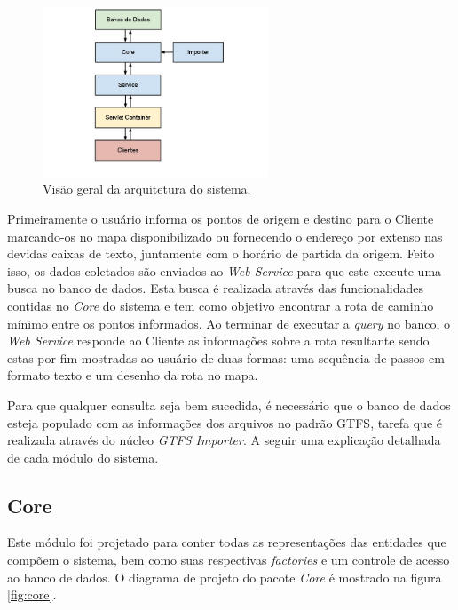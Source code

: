 \begin{figure}[!htb]
	\centering
	\includegraphics[width=0.6\textwidth]{./imgs/arquitetura.png}
	\caption[Arquitetura do sistema]{Visão geral da arquitetura do sistema.}
	\label{fig:arquitetura}
\end{figure}

Primeiramente o usuário informa os pontos de origem e destino para o Cliente marcando-os no mapa disponibilizado ou fornecendo o endereço por extenso nas devidas caixas de texto, juntamente com o horário de partida da origem.
Feito isso, os dados coletados são enviados ao \emph{Web Service} para que este execute uma busca no banco de dados. 
Esta busca é realizada através das funcionalidades contidas no \emph{Core} do sistema e tem como objetivo encontrar a rota de caminho mínimo entre os pontos informados.
Ao terminar de executar a \emph{query} no banco, o \emph{Web Service} responde ao Cliente as informações sobre a rota resultante sendo estas por fim mostradas ao usuário de duas formas: uma sequência de passos em formato texto e um desenho da rota no mapa.

Para que qualquer consulta seja bem sucedida, é necessário que o banco de dados esteja populado com as informações dos arquivos no padrão GTFS, tarefa que é realizada através do núcleo \emph{GTFS Importer}.
A seguir uma explicação detalhada de cada módulo do sistema.

\subsection{Core}
Este módulo foi projetado para conter todas as representações das entidades que compõem o sistema, bem como suas respectivas \emph{factories} e um controle de acesso ao banco de dados.
O diagrama de projeto do pacote \emph{Core} é mostrado na figura \ref{fig:core}.

